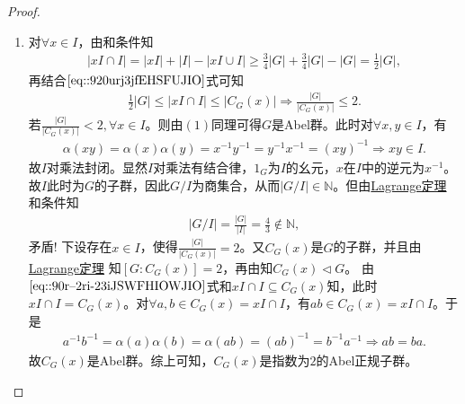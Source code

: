 \documentclass[../../main.tex]{subfiles}%
\begin{document}
\begin{proof}
\begin{enumerate}[(1)]
\item 对$\forall x\in I$，由和条件知
\begin{align*}
|xI\cap I|=|xI|+|I|-|xI\cup I|\geqslant \frac{3}{4}|G|+\frac{3}{4}|G|-|G|=\frac{1}{2}|G|,
\end{align*}
再结合$\eqref{eq::920urj3jfEHSFUJIO}$式可知
\begin{align}
\frac{1}{2}|G|\leqslant |xI\cap I|\leqslant |C_G(x)|\Longrightarrow \frac{|G|}{|C_G(x)|}\leqslant 2.
\label{eq::90r--2ri-23iJSWFHIOWJIO}
\end{align}
若$\frac{|G|}{|C_G(x)|}<2,\forall x\in I$。则由$(1)$同理可得$G$是Abel群。此时对$\forall x,y\in I$，有
\begin{align*}
\alpha(xy)=\alpha(x)\alpha(y)=x^{-1}y^{-1}=y^{-1}x^{-1}=(xy)^{-1}\Longrightarrow xy\in I.
\end{align*}
故$I$对乘法封闭。显然$I$对乘法有结合律，$1_G$为$I$的幺元，$x$在$I$中的逆元为$x^{-1}$。故$I$此时为$G$的子群，因此$G/I$为商集合，从而$|G/I|\in \mathbb{N}$。但由\hyperref[theorem:抽象代数--Lagrange定理]{Lagrange定理}
和条件知
\begin{align*}
|G/I|=\frac{|G|}{|I|}=\frac{4}{3}\notin \mathbb{N},
\end{align*}
矛盾!
下设存在$x\in I$，使得$\frac{|G|}{|C_G(x)|}=2$。又$C_G(x)$是$G$的子群，并且由\hyperref[theorem:抽象代数--Lagrange定理]{Lagrange定理}
知$[G:C_G(x)] = 2$，再由知$C_G(x)\lhd G$。
由$\eqref{eq::90r--2ri-23iJSWFHIOWJIO}$式和$xI\cap I\subseteq C_G(x)$知，此时$xI\cap I=C_G(x)$。对$\forall a,b\in C_G(x)=xI\cap I$，有$ab\in C_G(x)=xI\cap I$。于是
\begin{align*}
a^{-1}b^{-1}=\alpha(a)\alpha(b)=\alpha(ab)=(ab)^{-1}=b^{-1}a^{-1}\Longrightarrow ab=ba.
\end{align*}
故$C_G(x)$是Abel群。综上可知，$C_G(x)$是指数为$2$的Abel正规子群。
\end{enumerate}

\end{proof}
\end{document}
